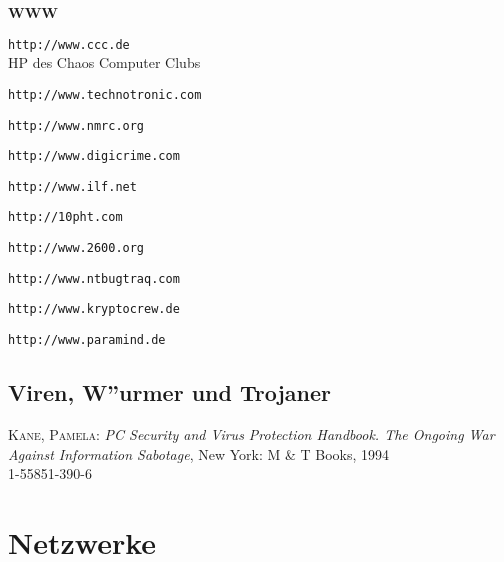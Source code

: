 \textbf{WWW}

\begin{description}

\item \texttt{http://www.ccc.de} \\
  HP des Chaos Computer Clubs
  
\item \texttt{http://www.technotronic.com}
  
\item \texttt{http://www.nmrc.org}
  
\item \texttt{http://www.digicrime.com}
  
\item \texttt{http://www.ilf.net}
  
\item \texttt{http://10pht.com}
  
\item \texttt{http://www.2600.org}
  
\item \texttt{http://www.ntbugtraq.com}
  
\item \texttt{http://www.kryptocrew.de}
  
\item \texttt{http://www.paramind.de}


\end{description}


\subsection{Viren, W''urmer und Trojaner}

\begin{description}

\item \textsc{Kane, Pamela}: \textit{PC Security and Virus Protection
Handbook. The Ongoing War Against Information Sabotage}, New York:
M \& T Books, 1994 \\
1-55851-390-6

\end{description}



\section{Netzwerke}

